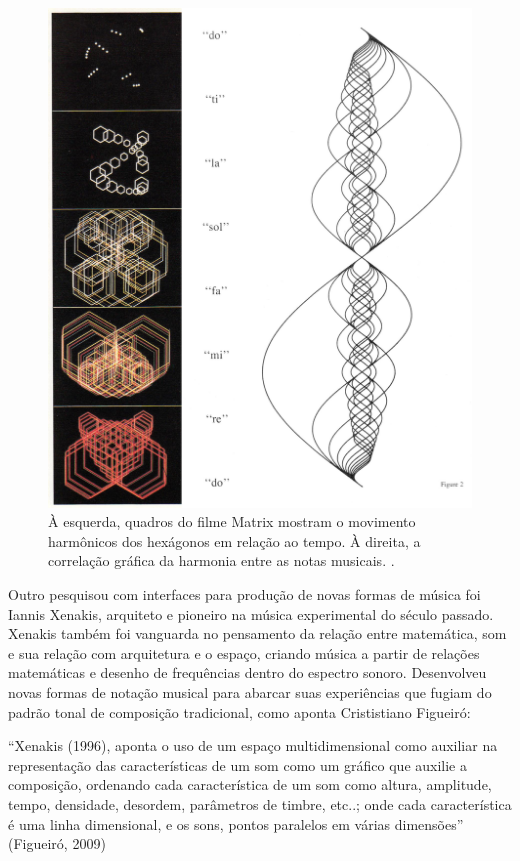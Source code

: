 \begin{figure}
    \caption{\label{matrix}À esquerda, quadros do filme Matrix mostram o movimento harmônicos dos hexágonos em relação ao tempo. À direita, a correlação gráfica da harmonia entre as notas musicais.
.}
    
        \includegraphics[width=0.8\linewidth]{pictures/cap2/witney2}
    
\end{figure}


Outro pesquisou com interfaces para produção de novas formas de música foi Iannis Xenakis, arquiteto e pioneiro na música experimental do século passado. Xenakis também foi vanguarda no pensamento da relação entre matemática, som e sua relação com arquitetura e o espaço, criando música a partir de relações matemáticas e desenho de frequências dentro do espectro sonoro. Desenvolveu novas formas de notação musical para abarcar suas experiências que fugiam do padrão tonal de composição tradicional, como aponta Crististiano Figueiró:

\begin{citacao}
``Xenakis (1996), aponta o uso de um espaço multidimensional como auxiliar na representação das características de um som como um gráfico que auxilie a composição, ordenando cada característica de um som como altura, amplitude, tempo, densidade, desordem, parâmetros de timbre, etc..; onde cada característica é uma linha dimensional, e os sons, pontos paralelos em várias dimensões'' (Figueiró, 2009)
\end{citacao}

